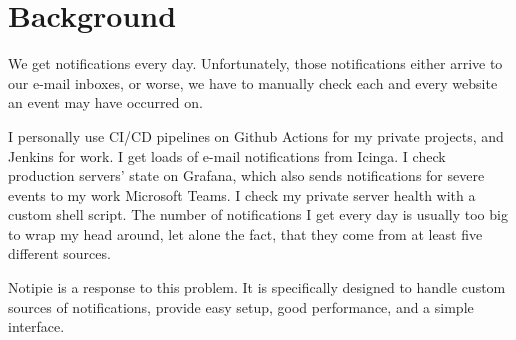 \section{Background}\label{sec:background}

We get notifications every day.
Unfortunately,
those notifications either arrive
to our e-mail inboxes,
or worse,
we have to manually check
each and every website an event may have occurred on.

I personally use CI/CD pipelines
on Github Actions for my private projects,
and Jenkins for work.
I get loads of e-mail notifications from Icinga.
I check production servers' state on Grafana,
which also sends notifications
for severe events to my work Microsoft Teams.
I check my private server health
with a custom shell script.
The number of notifications I get every day
is usually too big to wrap my head around,
let alone the fact,
that they come from at least five different sources.

Notipie is a response to this problem.
It is specifically designed
to handle custom sources of notifications,
provide easy setup,
good performance,
and a simple interface.
